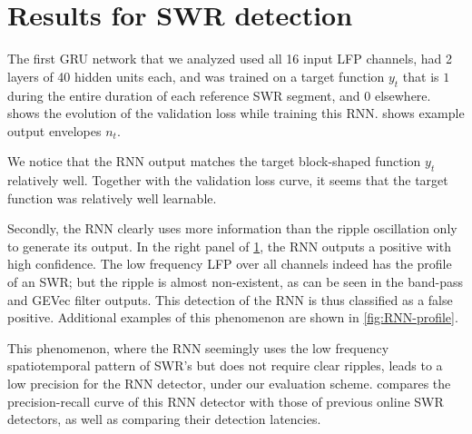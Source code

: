 \section{Results for SWR detection}
\label{sec:RNN-results}

The first GRU network that we analyzed used all 16 input LFP channels, had 2 layers of 40 hidden units each, and was trained on a target function $y_t$ that is $1$ during the entire duration of each reference SWR segment, and $0$ elsewhere.  shows the evolution of the validation loss while training this RNN.  shows example output envelopes $n_t$.

\begin{figure}
\label{fig:RNN-envelopes}
\end{figure}

We notice that the RNN output matches the target block-shaped function $y_t$ relatively well. Together with the validation loss curve, it seems that the target function was relatively well learnable.

Secondly, the RNN clearly uses more information than the ripple oscillation only to generate its output. In the right panel of \cref{fig:RNN-envelopes}, the RNN outputs a positive with high confidence. The low frequency LFP over all channels indeed has the profile of an SWR; but the ripple is almost non-existent, as can be seen in the band-pass and GEVec filter outputs. This detection of the RNN is thus classified as a false positive. Additional examples of this phenomenon are shown in \cref{fig:RNN-profile}.


This phenomenon, where the RNN seemingly uses the low frequency spatiotemporal pattern of SWR's but does not require clear ripples, leads to a low precision for the RNN detector, under our evaluation scheme.  compares the precision-recall curve of this RNN detector with those of previous online SWR detectors, as well as comparing their detection latencies.

